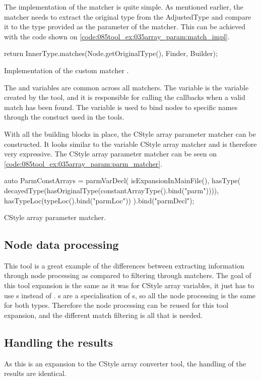 The implementation of the matcher is quite simple. As mentioned earlier, the matcher needs to extract the original type from the AdjustedType and compare it to the type provided as the parameter of the matcher. This can be achieved with the code shown on \cref{code:085tool_ex:035array_param:match_impl}.

\begin{listing}[H]
    \begin{cppcode}
return InnerType.matches(Node.getOriginalType(), Finder, Builder);
    \end{cppcode}
    \caption{Implementation of the custom matcher .}
    \label{code:085tool_ex:035array_param:match_impl}
\end{listing}

The  and  variables are common across all matchers. The  variable is the  variable created by the tool, and it is responsible for calling the callbacks when a valid match has been found. The  variable is used to bind nodes to specific names through the  constuct used in the tools.

With all the building blocks in place, the CStyle array parameter matcher can be constructed. It looks similar to the variable CStyle array matcher and is therefore very expressive. The CStyle array parameter matcher can be seen on \cref{code:085tool_ex:035array_param:parm_matcher}.

\begin{listing}[H]
    \begin{cppcode}
auto ParmConstArrays = parmVarDecl(
        isExpansionInMainFile(),
        hasType(
            decayedType(hasOriginalType(constantArrayType().bind("parm")))),
        hasTypeLoc(typeLoc().bind("parmLoc")) 
    ).bind("parmDecl");
    \end{cppcode}
    \caption{CStyle array parameter matcher.}
    \label{code:085tool_ex:035array_param:parm_matcher}
\end{listing}

\subsection{Node data processing}

This tool is a great example of the differences between extracting information through node processing as compared to filtering through matchers. The goal of this tool expansion is the same as it was for CStyle array variables, it just has to use s instead of . s are a specialisation of s, so all the node processing is the same for both types. Therefore the node processing can be reused for this tool expansion, and the different match filtering is all that is needed.

\subsection{Handling the results}

As this is an expansion to the CStyle array converter tool, the handling of the results are identical.